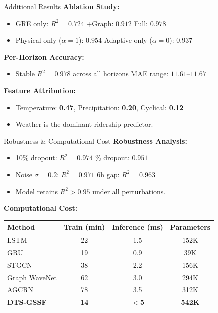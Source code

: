 \documentclass[aspectratio=169, 11pt]{beamer}
\begin{document}
\begin{frame}{Additional Results}
  \textbf{Ablation Study:}
  \begin{itemize}
    \item GRE only: $R^{2} = 0.724$ \quad +Graph: $0.912$ \quad Full: $\mathbf{0.978}$
    \item Physical only ($\alpha=1$): $0.954$ \quad Adaptive only ($\alpha=0$): $0.937$
  \end{itemize}

  \vspace{0.2em}
  \textbf{Per-Horizon Accuracy:}
  \begin{itemize}
    \item Stable $R^{2} = 0.978$ across all horizons \quad MAE range: $11.61$--$11.67$
  \end{itemize}

  \vspace{0.2em}
  \textbf{Feature Attribution:}
  \begin{itemize}
    \item Temperature: \textbf{0.47}, Precipitation: \textbf{0.20}, Cyclical: \textbf{0.12}
    \item \textcolor{accent}{Weather is the dominant ridership predictor.}
  \end{itemize}
\end{frame}

\begin{frame}{Robustness \& Computational Cost}
  \textbf{Robustness Analysis:}
  \begin{itemize}
    \item 10\% dropout: $R^{2} = 0.974$ \% dropout: $0.951$
    \item Noise $\sigma=0.2$: $R^{2} = 0.971$ \quad 6h gap: $R^{2} = 0.963$
    \item Model retains \textbf{$R^{2} > 0.95$} under all perturbations.
  \end{itemize}

  \vspace{0.4em}
  \textbf{Computational Cost:}
  \centering
  \small
  \begin{tabular}{lccc}
    \toprule
    Method & Train (min) & Inference (ms) & Parameters \\
    \midrule
    LSTM          & 22 & 1.5 & 152K \\
    GRU           & 19 & 0.9 & 39K \\
    STGCN         & 38 & 2.2 & 156K \\
    Graph WaveNet & 62 & 3.0 & 294K \\
    AGCRN         & 78 & 3.5 & 312K \\
    \textbf{DTS-GSSF} & \textbf{\color{accent}14} & \textbf{\color{accent}$<$5} & \textbf{\color{accent}542K} \\
    \bottomrule
  \end{tabular}
\end{frame}
\end{document}
